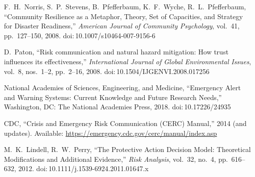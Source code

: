 \documentclass[11pt,twocolumn]{article}
\begin{document}
\begin{thebibliography}{99}
F.\ H.\ Norris, S.\ P.\ Stevens, B.\ Pfefferbaum, K.\ F.\ Wyche, R.\ L.\ Pfefferbaum, ``Community Resilience as a Metaphor, Theory, Set of Capacities, and Strategy for Disaster Readiness,'' \emph{American Journal of Community Psychology}, vol.\ 41, pp.\ 127--150, 2008. doi:\,10.1007/s10464-007-9156-6

D.\ Paton, ``Risk communication and natural hazard mitigation: How trust influences its effectiveness,'' \emph{International Journal of Global Environmental Issues}, vol.\ 8, nos.\ 1--2, pp.\ 2--16, 2008. doi:\,10.1504/IJGENVI.2008.017256

National Academies of Sciences, Engineering, and Medicine, ``Emergency Alert and Warning Systems: Current Knowledge and Future Research Needs,'' Washington, DC: The National Academies Press, 2018. doi:\,10.17226/24935

CDC, ``Crisis and Emergency Risk Communication (CERC) Manual,'' 2014 (and updates). Available: \url{https://emergency.cdc.gov/cerc/manual/index.asp}

M.\ K.\ Lindell, R.\ W.\ Perry, ``The Protective Action Decision Model: Theoretical Modifications and Additional Evidence,'' \emph{Risk Analysis}, vol.\ 32, no.\ 4, pp.\ 616--632, 2012. doi:\,10.1111/j.1539-6924.2011.01647.x

\end{thebibliography}

\balance
\end{document}
